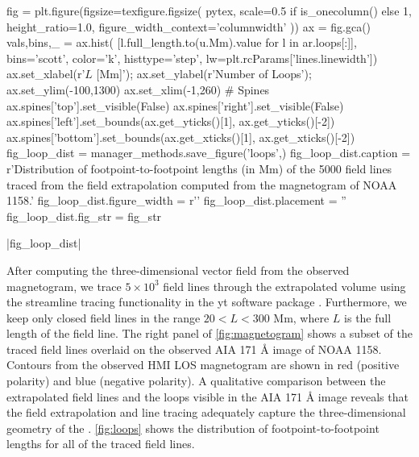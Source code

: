 \begin{pycode}
fig = plt.figure(figsize=texfigure.figsize(
    pytex,
    scale=0.5 if is_onecolumn() else 1,
    height_ratio=1.0,
    figure_width_context='columnwidth'
))
ax = fig.gca()
vals,bins,_ = ax.hist(
    [l.full_length.to(u.Mm).value for l in ar.loops[:]],
    bins='scott', color='k', histtype='step', lw=plt.rcParams['lines.linewidth'])
ax.set_xlabel(r'$L$ [Mm]');
ax.set_ylabel(r'Number of Loops');
ax.set_ylim(-100,1300)
ax.set_xlim(-1,260)
# Spines
ax.spines['top'].set_visible(False)
ax.spines['right'].set_visible(False)
ax.spines['left'].set_bounds(ax.get_yticks()[1], ax.get_yticks()[-2])
ax.spines['bottom'].set_bounds(ax.get_xticks()[1], ax.get_xticks()[-2])
fig_loop_dist = manager_methods.save_figure('loops',)
fig_loop_dist.caption = r'Distribution of footpoint-to-footpoint lengths (in Mm) of the 5000 field lines traced from the field extrapolation computed from the magnetogram of NOAA 1158.'
fig_loop_dist.figure_width = r'\columnwidth'
fig_loop_dist.placement = ''
fig_loop_dist.fig_str = fig_str
\end{pycode}
|fig_loop_dist|

After computing the three-dimensional vector field from the observed magnetogram, we trace $5\times10^3$ field lines through the extrapolated volume using the streamline tracing functionality in the yt software package \citep{turk_yt_2011}.  Furthermore, we keep only closed field lines in the range $20<L<300$ Mm, where $L$ is the full length of the field line. The right panel of \autoref{fig:magnetogram} shows a subset of the traced field lines overlaid on the observed AIA 171 \AA{} image of NOAA 1158. Contours from the observed HMI LOS magnetogram are shown in red (positive polarity) and blue (negative polarity). A qualitative comparison between the extrapolated field lines and the loops visible in the AIA 171 \AA{} image reveals that the field extrapolation and line tracing adequately capture the three-dimensional geometry of the \AR{}. \autoref{fig:loops} shows the distribution of footpoint-to-footpoint lengths for all of the traced field lines.

